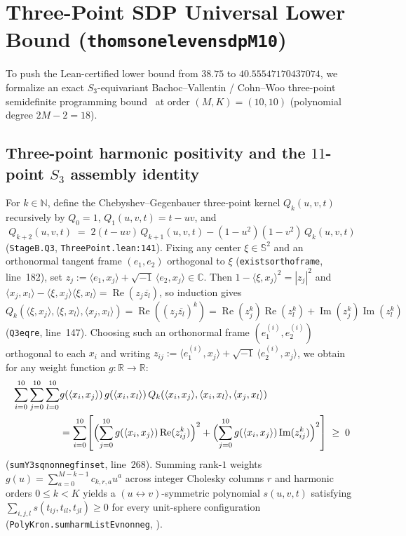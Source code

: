 \documentclass[11pt,reqno]{amsart}
\renewcommand{\_}{\origunderscore\allowbreak}
\theoremstyle{definition}
\newcommand{\R}{\mathbb{R}}
\newcommand{\C}{\mathbb{C}}
\newcommand{\N}{\mathbb{N}}
\newcommand{\Sph}{\mathbb{S}^2}
\newcommand{\ip}[2]{\langle #1, #2 \rangle}
\begin{document}
\section{Three-Point SDP Universal Lower Bound (\texorpdfstring{\textnormal{\texttt{thomson\_eleven\_sdp\_M10}}}{thomson\_eleven\_sdp\_M10})}\label{sec:sdp-lb}

To push the Lean-certified lower bound from $38.75$ to $40.55547170437074$, we formalize an exact $S_3$-equivariant Bachoc--Vallentin / Cohn--Woo three-point semidefinite programming bound~\cite{BachocVallentin2008,CohnWoo2012} at order $(M,K) = (10,10)$ (polynomial degree $2M-2 = 18$).

\subsection{Three-point harmonic positivity and the \texorpdfstring{$11$}{11}-point \texorpdfstring{$S_3$}{S3} assembly identity}\label{subsec:assembly}
For $k \in \N$, define the Chebyshev--Gegenbauer three-point kernel $Q_k(u,v,t)$ recursively by $Q_0 = 1$, $Q_1(u,v,t) = t - uv$, and
\begin{equation}\label{eq:Qk}
  Q_{k+2}(u,v,t) \;=\; 2(t - uv)\,Q_{k+1}(u,v,t) - (1-u^2)(1-v^2)\,Q_k(u,v,t)
\end{equation}
(\texttt{StageB.Q3}, \texttt{ThreePoint.lean:141}).
Fixing any center $\xi \in \Sph$ and an orthonormal tangent frame $(e_1, e_2)$ orthogonal to $\xi$ (\texttt{exists\_ortho\_frame}, line~182), set $z_j := \ip{e_1}{x_j} + \sqrt{-1}\,\ip{e_2}{x_j} \in \C$.
Then $1 - \ip{\xi}{x_j}^2 = |z_j|^2$ and $\ip{x_j}{x_l} - \ip{\xi}{x_j}\ip{\xi}{x_l} = \operatorname{Re}(z_j \overline{z_l})$, so induction gives $Q_k(\ip{\xi}{x_j}, \ip{\xi}{x_l}, \ip{x_j}{x_l}) = \operatorname{Re}((z_j \overline{z_l})^k) = \operatorname{Re}(z_j^k)\operatorname{Re}(z_l^k) + \operatorname{Im}(z_j^k)\operatorname{Im}(z_l^k)$ (\texttt{Q3\_eq\_re}, line~147).
Choosing such an orthonormal frame $(e_1^{(i)}, e_2^{(i)})$ orthogonal to each $x_i$ and writing $z_{ij} := \ip{e_1^{(i)}}{x_j} + \sqrt{-1}\,\ip{e_2^{(i)}}{x_j}$, we obtain for any weight function $g : \R \to \R$:
\begin{align}\label{eq:bv-pos}
  \sum_{i=0}^{10}\sum_{j=0}^{10}\sum_{l=0}^{10}
  &g(\ip{x_i}{x_j})\,g(\ip{x_i}{x_l})\,Q_k(\ip{x_i}{x_j},\ip{x_i}{x_l},\ip{x_j}{x_l}) \nonumber \\
  &= \sum_{i=0}^{10}\!\left[\Bigl(\sum_{j=0}^{10} g(\ip{x_i}{x_j})\operatorname{Re}(z_{ij}^k)\Bigr)^2
    + \Bigl(\sum_{j=0}^{10} g(\ip{x_i}{x_j})\operatorname{Im}(z_{ij}^k)\Bigr)^2\right] \;\ge\; 0
\end{align}
(\texttt{sum\_Y3\_sq\_nonneg\_finset}, line~268).
Summing rank-$1$ weights $g(u) = \sum_{a=0}^{M-k-1} c_{k,r,a} u^a$ across integer Cholesky columns $r$ and harmonic orders $0 \le k < K$ yields a $(u \leftrightarrow v)$-symmetric polynomial $s(u,v,t)$ satisfying $\sum_{i,j,l} s(t_{ij}, t_{il}, t_{jl}) \ge 0$ for every unit-sphere configuration (\texttt{PolyKron.\allowbreak sum\_harmListEv\_nonneg}, ).
\end{document}

